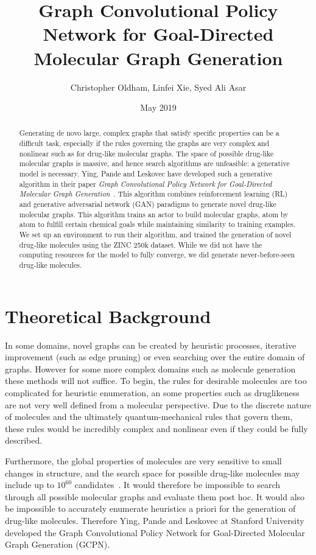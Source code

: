 \documentclass{article}
\title{Graph Convolutional Policy Network for Goal-Directed Molecular Graph Generation}
\author{Christopher Oldham, Linfei Xie, Syed Ali Asar }
\date{May 2019}
\begin{document}
\maketitle

\begin{abstract}
    Generating de novo large, complex graphs that satisfy specific properties can be a difficult task, especially if the rules governing the graphs are very complex and nonlinear such as for drug-like molecular graphs. The space of possible drug-like molecular graphs is massive, and hence search algorithms are unfeasible: a generative model is necessary. Ying, Pande and Leskovec have developed such a generative algorithm in their paper \textit{Graph Convolutional Policy Network for Goal-Directed Molecular Graph Generation}~\cite{GCPN}. This algorithm combines reinforcement learning (RL) and generative adversarial network (GAN) paradigms to generate novel drug-like molecular graphs. This algorithm trains an actor to build molecular graphs, atom by atom to fulfill certain chemical goals while maintaining similarity to training examples. We set up an environment to run their algorithm, and trained the generation of novel drug-like molecules using the ZINC 250k dataset. While we did not have the computing resources for the model to fully converge, we did generate never-before-seen drug-like molecules.
\end{abstract}

\section{Theoretical Background}
In some domains, novel graphs can be created by heuristic processes, iterative improvement (such as edge pruning) or even searching over the entire domain of graphs. However for some more complex domains such as molecule generation these methods will not suffice. To begin, the rules for desirable molecules are too complicated for heuristic enumeration, an some properties such as druglikeness are not very well defined from a molecular perspective. Due to the discrete nature of molecules and the ultimately quantum-mechanical rules that govern them, these rules would be incredibly complex and nonlinear even if they could be fully described.

Furthermore, the global properties of molecules are very sensitive to small changes in structure, and the search space for possible drug-like molecules may include up to $10^{60}$ candidates~\cite{nummols}. It would therefore be impossible to search through all possible molecular graphs and evaluate them post hoc. It would also be impossible to accurately enumerate heuristics a priori for the generation of drug-like molecules. Therefore Ying, Pande and Leskovec at Stanford University developed the Graph Convolutional Policy Network for Goal-Directed Molecular Graph Generation (GCPN).
\end{document}
